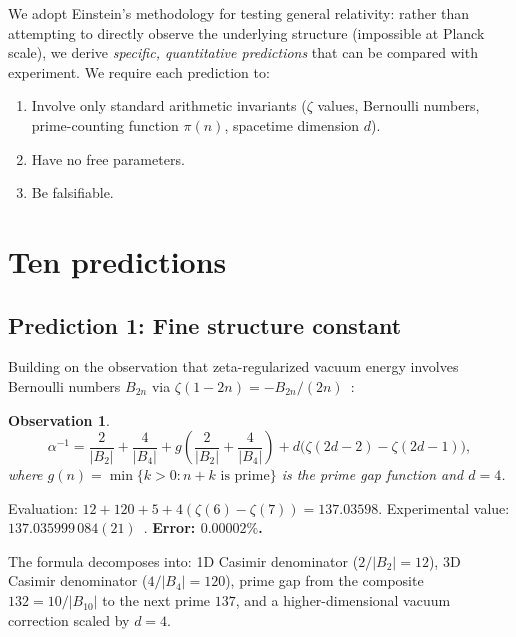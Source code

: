 \documentclass[11pt,a4paper]{article}
\newtheorem{observation}[theorem]{Observation}
\begin{document}
We adopt Einstein's methodology for testing general relativity:
rather than attempting to directly observe the underlying
structure (impossible at Planck scale), we derive \emph{specific,
quantitative predictions} that can be compared with experiment.
We require each prediction to:
\begin{enumerate}
\item Involve only standard arithmetic invariants
  ($\zeta$ values, Bernoulli numbers, prime-counting function $\pi(n)$,
  spacetime dimension $d$).
\item Have no free parameters.
\item Be falsifiable.
\end{enumerate}

\section{Ten predictions}
\label{sec:predictions}

\subsection{Prediction 1: Fine structure constant}

Building on the observation that zeta-regularized vacuum energy
involves Bernoulli numbers $B_{2n}$ via
$\zeta(1{-}2n) = -B_{2n}/(2n)$~\cite{Hawking1977,Elizalde2012}:

\begin{observation}
\label{obs:alpha}
\begin{equation}
  \alpha^{-1} = \frac{2}{|B_2|} + \frac{4}{|B_4|}
  + g\!\left(\frac{2}{|B_2|} + \frac{4}{|B_4|}\right)
  + d\bigl(\zeta(2d{-}2) - \zeta(2d{-}1)\bigr),
  \label{eq:alpha}
\end{equation}
where $g(n) = \min\{k > 0 : n+k \text{ is prime}\}$ is the
prime gap function and $d = 4$.
\end{observation}

Evaluation: $12 + 120 + 5 + 4(\zeta(6) - \zeta(7)) = 137.03598$.
Experimental value: $137.035999\,084(21)$~\cite{Mohr2016}.
\textbf{Error: $\mathbf{0.00002\%}$.}

The formula decomposes into: 1D Casimir denominator ($2/|B_2| = 12$),
3D Casimir denominator ($4/|B_4| = 120$), prime gap from the
composite $132 = 10/|B_{10}|$ to the next prime $137$,
and a higher-dimensional vacuum correction scaled by $d = 4$.
\end{document}
